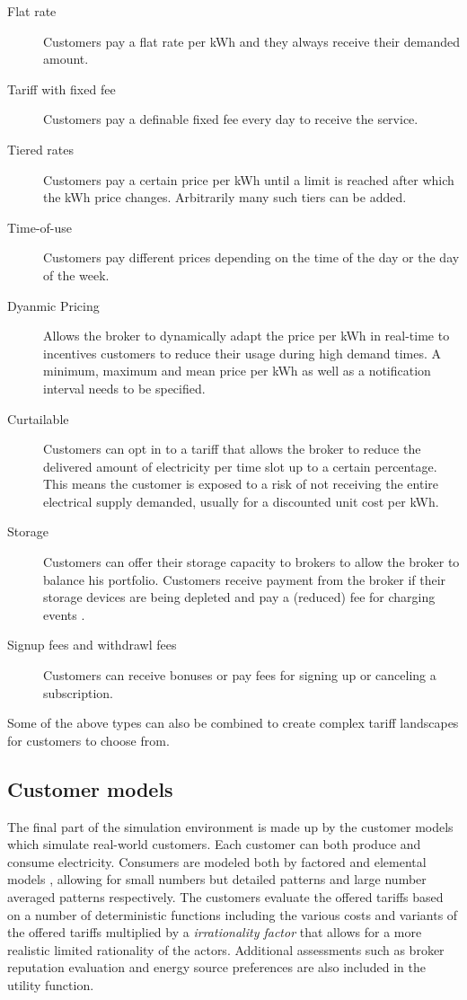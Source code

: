 \begin{description}
	\item[Flat rate] Customers pay a flat rate per kWh and they always receive their demanded amount.
	\item[Tariff with fixed fee] Customers pay a definable fixed fee every day to receive the service. 
	\item [Tiered rates] Customers pay a certain price per kWh until a limit is reached after which the kWh price changes. Arbitrarily many such tiers can be added.
	\item[Time-of-use] Customers pay different prices depending on the time of the day or the day of the week.
	\item[Dyanmic Pricing] Allows the broker to dynamically adapt the price per kWh in real-time to incentives customers to reduce their usage during high demand times. A minimum, maximum and mean price per kWh as well as a notification interval needs to be specified. 
	\item[Curtailable] Customers can opt in to a tariff that allows the broker to reduce the delivered amount of electricity per time slot up to a certain percentage. This means the customer is exposed to a risk of not receiving the entire electrical supply demanded, usually for a discounted unit cost per kWh.
	\item[Storage] Customers can offer their storage capacity to brokers to allow the broker to balance his portfolio. Customers receive payment from the broker if their storage devices are being depleted and pay a (reduced) fee for charging events \citep[p.9]{ketter2018powertac}. 
	\item[Signup fees and withdrawl fees] Customers can receive bonuses or pay fees for signing up or canceling a subscription.
\end{description}

Some of the above types can also be combined to create complex tariff landscapes for customers to choose from. 

\subsection{Customer models}%
\label{sub:customer_models}

The final part of the simulation environment is made up by the customer models which simulate real-world customers. Each customer can both produce and consume electricity. Consumers are modeled both by factored and elemental models \citep[p.14]{ketter2018powertac}, allowing for small numbers but detailed patterns and large number averaged patterns respectively. The customers evaluate the offered tariffs based on a number of deterministic functions including the various costs and variants of the offered tariffs multiplied by a \emph{irrationality factor} that allows for a more realistic limited rationality of the actors. Additional assessments such as broker reputation evaluation and energy source preferences are also included in the utility function. 

